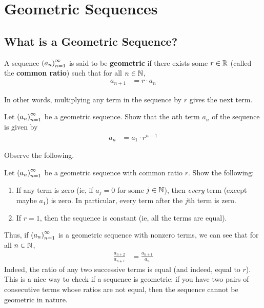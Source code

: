 \section{Geometric Sequences}

\subsection{What is a Geometric Sequence?}

\begin{definition}
    A sequence $\left( a_n \right)_{n=1}^{\infty}$ is said to be \textbf{geometric} if there exists some $r \in \mathbb{R}$ (called the \textbf{common ratio}) such that for all $n \in \mathbb{N}$,
    \begin{align}
        a_{n+1} &= r \cdot a_n
    \end{align}
\end{definition}
In other words, multiplying any term in the sequence by $r$ gives the next term.

\begin{boxexercise}
    Let $\left( a_n \right)_{n=1}^{\infty}$ be a geometric sequence. Show that the $n$th term $a_n$ of the sequence is given by
    \begin{align}
        a_n &= a_1 \cdot r^{n - 1}
    \end{align}
\end{boxexercise}

Observe the following.
\begin{boxhexercise} Let $\left( a_n \right)_{n=1}^{\infty}$ be a geometric sequence with common ratio $r$. Show the following:
\begin{enumerate}
    \item If any term is zero (ie, if $a_j = 0$ for some $j \in \mathbb{N}$), then \textit{every} term (except maybe $a_1$) is zero. In particular, every term after the $j$th term is zero.
    \item If $r = 1$, then the sequence is constant (ie, all the terms are equal).
\end{enumerate}
\end{boxhexercise}

Thus, if $\left( a_n \right)_{n=1}^{\infty}$ is a geometric sequence with nonzero terms, we can see that for all $n \in \mathbb{N}$,
\begin{align}
    \frac{a_{n+2}}{a_{n+1}} &= \frac{a_{n+1}}{a_n}
\end{align}
Indeed, the ratio of any two successive terms is equal (and indeed, equal to $r$). This is a nice way to check if a sequence is geometric: if you have two pairs of consecutive terms whose ratios are not equal, then the sequence cannot be geometric in nature.

